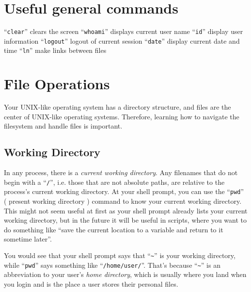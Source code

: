 \documentclass{extbook}
\begin{document}

\section{Useful general commands}
``\verb|clear|'' clears the screen
``\verb|whoami|'' displays current user name
``\verb|id|''  display user information
``\verb|logout|'' logout of current session
``\verb|date|'' display current date and time
``\verb|ln|'' make links between files

\section{File Operations}

Your UNIX-like operating system has a directory structure, and files are the center of UNIX-like operating systems.  Therefore, learning how to navigate the filesystem and handle files is important.

\subsection{Working Directory}

In any process, there is a \textit{current working directory}.  Any filenames that do not begin with a ``\verb|/|'', i.e. those that are not absolute paths, are relative to the process's current working directory.  At your shell prompt, you can use the ``\verb|pwd|'' ( present working directory ) command to know your current working directory.  This might not seem useful at first as your shell prompt already lists your current working directory, but in the future it will be useful in scripts, where you want to do something like ``save the current location to a variable and return to it sometime later''.

You would see that your shell prompt says that ``\verb|~|'' is your working directory, while ``\verb|pwd|'' says something like ``\verb|/home/user/|''.  That's because ``\verb|~|'' is an abbreviation to your user's \textit{home directory}, which is usually where you land when you login and is the place a user stores their personal files.
\end{document}

